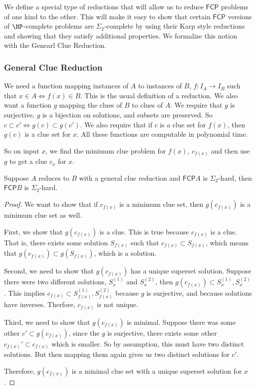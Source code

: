 \documentclass[runningheads,a4paper]{llncs}
\begin{document}
We define a special type of reductions that will allow us to reduce $\mathsf{FCP}$ problems of one kind to the other. This will make it easy to show that certain $\mathsf{FCP}$ versions of $\NP$-complete problems are $\Sigma_2$-complete by using their Karp style reductions and showing that they satisfy additional properties. We formalize this notion with the Genearl Clue Reduction.

\subsubsection{General Clue Reduction}
We need a function mapping instances of $A$ to instances of $B$, $f: I_A \rightarrow I_B$ such that $x \in A \iff f(x) \in B$. This is the usual definition of a reduction. We also want a function $g$ mapping the clues of $B$ to clues of $A$. We require that $g$ is surjective, $g$ is a bijection on solutions, and subsets are preserved. So $c \subset c' \iff g(c) \subset g(c')$. We also require that if $c$ is a clue set for $f(x)$, then $g(c)$ is a clue set for $x$. All these functions are computable in polynomial time.

So on input $x$, we find the minimum clue problem for $f(x)$, $c_{f(x)}$ and then use $g$ to get a clue $c_x$ for $x$.  

\begin{theorem}
\label{thm:reduction}
Suppose $A$ reduces to $B$ with a general clue reduction and $\mathsf{FCP} A$ is $\Sigma_2$-hard, then $\mathsf{FCP} B$ is $\Sigma_2$-hard. 
\end{theorem}

\begin{proof}
We want to show that if $c_{f(x)}$ is a minimum clue set, then $g(c_{f(x)})$ is a minimum clue set as well.

First, we show that $g(c_{f(x)})$ is a clue. This is true because $c_{f(x)}$ is a clue. That is, there exists some solution $S_{f(x)}$ such that $c_{f(x)} \subset S_{f(x)}$, which means that $g(c_{f(x)}) \subset g(S_{f(x)})$, which is a solution.

Second, we need to show that $g(c_{f(x)})$ has a unique superset solution. Suppose there were two different solutions, $S_x^{(1)}$ and $S_{x}^{(2)}$, then $g(c_{f(x)}) \subset S_x^{(1)}, S_x^{(2)}$. This implies $c_{f(x)} \subset S_{f(x)}^{(1)}, S_{f(x)}^{(2)}$ because $g$ is surjective, and because solutions have inverses. Therfore, $c_{f(x)}$ is not unique.

Third, we need to show that $g(c_{f(x)})$ is minimal. Suppose there was some other $c' \subset g(c_{f(x)})$, since the $g$ is surjective, there exists some other $c_{f(x)}' \subset c_{f(x)}$ which is smaller. So by assumption, this must have two distinct solutions. But then mapping them again gives us two distinct solutions for $c'$. 

Therefore, $g(c_{f(x)})$ is a minimal clue set with a unique superset solution for $x$.
\end{proof}
\end{document}
